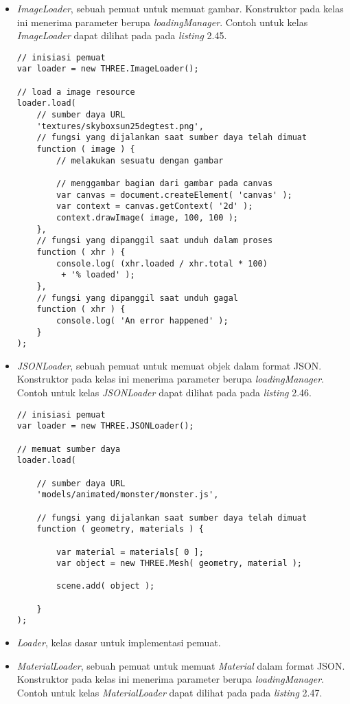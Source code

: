 \begin{itemize}
\begin{itemize}
	\item {\it ImageLoader}, sebuah pemuat untuk memuat gambar. Konstruktor pada kelas ini menerima parameter berupa  {\it loadingManager}. Contoh untuk kelas {\it ImageLoader} dapat dilihat pada pada {\it listing} 2.45.
	
\begin{lstlisting}[caption={Contoh penggunaan kelas {\it ImageLoader}.},captionpos=b]
// inisiasi pemuat
var loader = new THREE.ImageLoader();

// load a image resource
loader.load(
	// sumber daya URL
	'textures/skyboxsun25degtest.png',
	// fungsi yang dijalankan saat sumber daya telah dimuat
	function ( image ) {
		// melakukan sesuatu dengan gambar

		// menggambar bagian dari gambar pada canvas
		var canvas = document.createElement( 'canvas' );
		var context = canvas.getContext( '2d' );
		context.drawImage( image, 100, 100 );
	},
	// fungsi yang dipanggil saat unduh dalam proses
	function ( xhr ) {
		console.log( (xhr.loaded / xhr.total * 100)
		 + '% loaded' );
	},
	// fungsi yang dipanggil saat unduh gagal
	function ( xhr ) {
		console.log( 'An error happened' );
	}
);
\end{lstlisting}

	\item {\it JSONLoader}, sebuah pemuat untuk memuat objek dalam format JSON. Konstruktor pada kelas ini menerima parameter berupa  {\it loadingManager}. Contoh untuk kelas {\it JSONLoader} dapat dilihat pada pada {\it listing} 2.46.
	
\begin{lstlisting}[caption={Contoh penggunaan kelas {\it JSONLoader}.},captionpos=b]
// inisiasi pemuat
var loader = new THREE.JSONLoader();

// memuat sumber daya
loader.load(

	// sumber daya URL
	'models/animated/monster/monster.js',

	// fungsi yang dijalankan saat sumber daya telah dimuat
	function ( geometry, materials ) {

		var material = materials[ 0 ];
		var object = new THREE.Mesh( geometry, material );

		scene.add( object );

	}
);
\end{lstlisting}

	\item {\it Loader}, kelas dasar untuk implementasi pemuat.
	
	\item {\it MaterialLoader}, sebuah pemuat untuk memuat {\it Material} dalam format JSON. Konstruktor pada kelas ini menerima parameter berupa  {\it loadingManager}. Contoh untuk kelas {\it MaterialLoader} dapat dilihat pada pada {\it listing} 2.47.
	

\end{itemize}
\end{itemize}
